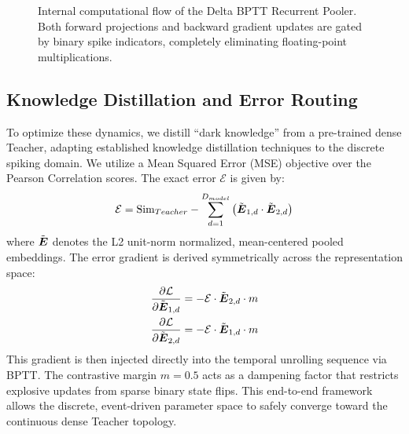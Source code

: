 \documentclass[10pt]{article} %
\begin{document}
\begin{figure}[t!]
\begin{center}
{%
}
\end{center}
\caption{Internal computational flow of the Delta BPTT Recurrent Pooler. Both forward projections and backward gradient updates are gated by binary spike indicators, completely eliminating floating-point multiplications.}
\label{fig:pooler_mech}
\end{figure}

\subsection{Knowledge Distillation and Error Routing}
To optimize these dynamics, we distill ``dark knowledge'' from a pre-trained dense Teacher, adapting established knowledge distillation techniques \citep{hinton2015distilling} to the discrete spiking domain. We utilize a Mean Squared Error (MSE) objective over the Pearson Correlation scores. The exact error $\mathcal{E}$ is given by:
\begin{equation}
\mathcal{E} = \text{Sim}_{Teacher} - \sum_{d=1}^{D_{model}} \left(\tilde{\boldsymbol{E}}_{1,d} \cdot \tilde{\boldsymbol{E}}_{2,d}\right)
\end{equation}
where $\tilde{\boldsymbol{E}}$ denotes the L2 unit-norm normalized, mean-centered pooled embeddings. The error gradient is derived symmetrically across the representation space:
\begin{align}
\frac{\partial \mathcal{L}}{\partial \tilde{\boldsymbol{E}}_{1,d}} &= -\mathcal{E} \cdot \tilde{\boldsymbol{E}}_{2,d} \cdot m \\
\frac{\partial \mathcal{L}}{\partial \tilde{\boldsymbol{E}}_{2,d}} &= -\mathcal{E} \cdot \tilde{\boldsymbol{E}}_{1,d} \cdot m
\end{align}
This gradient is then injected directly into the temporal unrolling sequence via BPTT. The contrastive margin $m=0.5$ acts as a dampening factor that restricts explosive updates from sparse binary state flips. This end-to-end framework allows the discrete, event-driven parameter space to safely converge toward the continuous dense Teacher topology.
\end{document}
